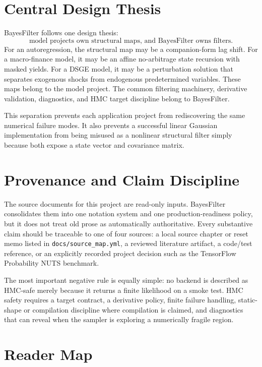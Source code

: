 \section{Central Design Thesis}
\label{sec:bf-intro-design-thesis}

BayesFilter follows one design thesis:
\[
  \text{model projects own structural maps, and BayesFilter owns filters.}
\]
For an autoregression, the structural map may be a companion-form lag shift.
For a macro-finance model, it may be an affine no-arbitrage state recursion
with masked yields.  For a DSGE model, it may be a perturbation solution that
separates exogenous shocks from endogenous predetermined variables.  These maps
belong to the model project.  The common filtering machinery, derivative
validation, diagnostics, and HMC target discipline belong to BayesFilter.

This separation prevents each application project from rediscovering the same
numerical failure modes.  It also prevents a successful linear Gaussian
implementation from being misused as a nonlinear structural filter simply
because both expose a state vector and covariance matrix.

\section{Provenance and Claim Discipline}
\label{sec:bf-intro-provenance}

The source documents for this project are read-only inputs.  BayesFilter
consolidates them into one notation system and one production-readiness policy,
but it does not treat old prose as automatically authoritative.  Every
substantive claim should be traceable to one of four sources: a local source
chapter or reset memo listed in \texttt{docs/source\_map.yml}, a reviewed
literature artifact, a code/test reference, or an explicitly recorded project
decision such as the TensorFlow Probability NUTS benchmark.

The most important negative rule is equally simple: no backend is described as
HMC-safe merely because it returns a finite likelihood on a smoke test.  HMC
safety requires a target contract, a derivative policy, finite failure handling,
static-shape or compilation discipline where compilation is claimed, and
diagnostics that can reveal when the sampler is exploring a numerically fragile
region.

\section{Reader Map}
\label{sec:bf-reader-map}

